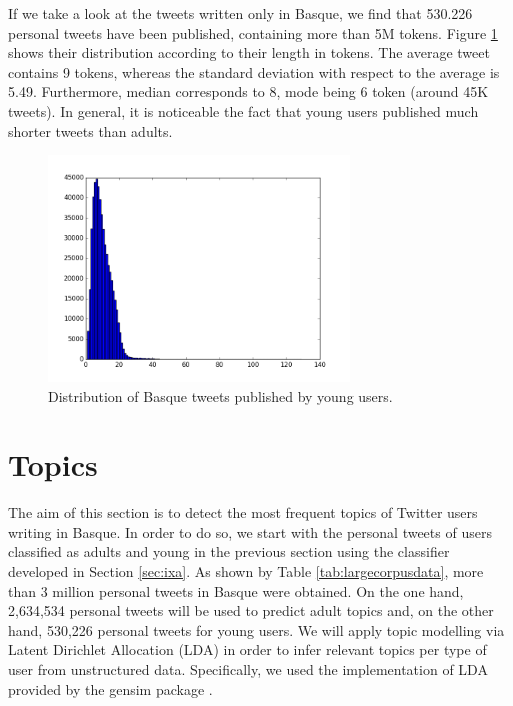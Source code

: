 \documentclass[information,article,submit,moreauthors,pdftex,10pt,a4paper]{Definitions/mdpi}
\begin{document}
If we take a look at the tweets written only in Basque, we find that 530.226 personal tweets have been published, containing more than 5M tokens. Figure  \ref{fig:txio luze gzt} shows their distribution according to their length in tokens. The average tweet contains 9 tokens, whereas the standard deviation with respect to the average is 5.49. Furthermore, median corresponds to 8, mode being 6 token (around 45K tweets). In general, it is noticeable the fact that young users published much shorter tweets than adults.

\begin{figure}[H]
  \centering
  \includegraphics[height=6cm]{graf_inf}
  \caption{Distribution of Basque tweets published by young users.}
  \label{fig:txio luze gzt}
\end{figure}



\section{Topics}\label{sec:topics}

The aim of this section is to detect the most frequent topics of Twitter users writing in Basque. In order to do so, we start with the personal tweets of users classified as adults and young in the previous section using the classifier developed in Section \ref{sec:ixa}. As shown by Table \ref{tab:largecorpusdata}, more than 3 million personal tweets in Basque were obtained. On the one hand, 2,634,534 personal tweets will be used to predict adult topics and, on the other hand, 530,226 personal tweets for young users. We will apply topic modelling via Latent Dirichlet Allocation (LDA) \cite{blei2003latent} in order to infer relevant topics per type of user from unstructured data. Specifically, we used the implementation of LDA provided by the gensim package \cite{rehurek2010software}.
\end{document}
